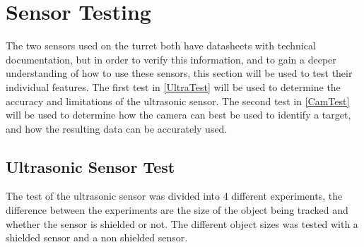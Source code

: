 \section{Sensor Testing}
The two sensors used on the turret both have datasheets with technical
documentation, but in order to verify this information, and to gain a
deeper understanding of how to use these sensors, this section will be used to
test their individual features. The first test in \autoref{UltraTest} will be
used to determine the accuracy and limitations of the ultrasonic sensor. The second
test in \autoref{CamTest} will be used to determine how the camera can best be
used to identify a target, and how the resulting data can be accurately used. 

% 
 


\subsection{Ultrasonic Sensor Test}\label{UltraTest}
The test of the ultrasonic sensor was divided into 4 different experiments, the
difference between the experiments are the size of the object being tracked and
whether the sensor is shielded or not. The different object sizes was tested
with a shielded sensor and a non shielded sensor. \nl

